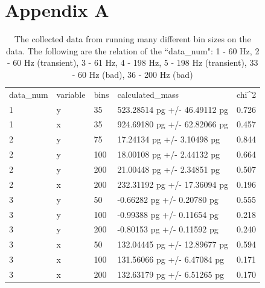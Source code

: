 \documentclass[12pt]{article}
\begin{document}


\vskip 0.2in




\newpage
\clearpage
\section*{Appendix A}


\begin{longtable}{lllll}
\caption{The collected data from running many different bin sizes on the data. The following are the relation of the ``data\_num": 1 - 60 Hz, 2 - 60 Hz (transient), 3 - 61 Hz, 4 - 198 Hz, 5 - 198 Hz (transient), 33 - 60 Hz (bad), 36 - 200 Hz (bad)}
\label{tab:calc_data}\\
data\_num & variable & bins & calculated\_mass             & chi\textasciicircum{}2 \\
1         & y        & 35   & 523.28514 pg +/- 46.49112 pg & 0.726                  \\
1         & x        & 35   & 924.69180 pg +/- 62.82066 pg & 0.457                  \\
2         & y        & 75   & 17.24134 pg +/- 3.10498 pg   & 0.844                  \\
2         & y        & 100  & 18.00108 pg +/- 2.44132 pg   & 0.664                  \\
2         & y        & 200  & 21.00448 pg +/- 2.34851 pg   & 0.507                  \\
2         & x        & 200  & 232.31192 pg +/- 17.36094 pg & 0.196                  \\
3         & y        & 50   & -0.66282 pg +/- 0.20780 pg   & 0.555                  \\
3         & y        & 100  & -0.99388 pg +/- 0.11654 pg   & 0.218                  \\
3         & y        & 200  & -0.80153 pg +/- 0.11592 pg   & 0.240                  \\
3         & x        & 50   & 132.04445 pg +/- 12.89677 pg & 0.594                  \\
3         & x        & 100  & 131.56066 pg +/- 6.47084 pg  & 0.171                  \\
3         & x        & 200  & 132.63179 pg +/- 6.51265 pg  & 0.170                  \\

\end{longtable}
\end{document}
